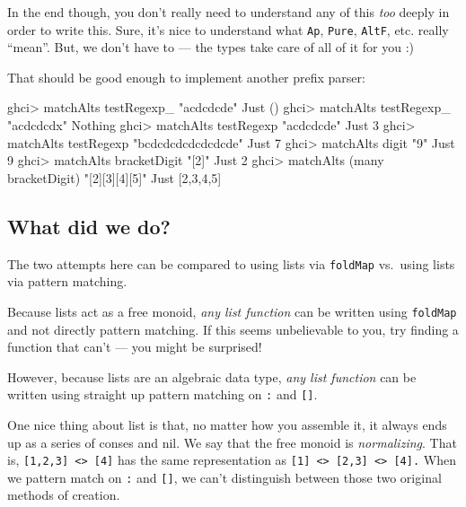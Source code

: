 \documentclass[]{article}
\newenvironment{Shaded}{}{}
\newcommand{\DataTypeTok}[1]{\textcolor[rgb]{0.56,0.13,0.00}{#1}}
\newcommand{\DecValTok}[1]{\textcolor[rgb]{0.25,0.63,0.44}{#1}}
\newcommand{\FunctionTok}[1]{\textcolor[rgb]{0.02,0.16,0.49}{#1}}
\newcommand{\NormalTok}[1]{#1}
\newcommand{\StringTok}[1]{\textcolor[rgb]{0.25,0.44,0.63}{#1}}
\begin{document}
In the end though, you don't really need to understand any of this \emph{too}
deeply in order to write this. Sure, it's nice to understand what \texttt{Ap},
\texttt{Pure}, \texttt{AltF}, etc. really ``mean''. But, we don't have to ---
the types take care of all of it for you :)

That should be good enough to implement another prefix parser:

\begin{Shaded}
\begin{Highlighting}[]
\NormalTok{ghci}\FunctionTok{>}\NormalTok{ matchAlts testRegexp_ }\StringTok{"acdcdcde"}
\DataTypeTok{Just}\NormalTok{ ()}
\NormalTok{ghci}\FunctionTok{>}\NormalTok{ matchAlts testRegexp_ }\StringTok{"acdcdcdx"}
\DataTypeTok{Nothing}
\NormalTok{ghci}\FunctionTok{>}\NormalTok{ matchAlts testRegexp }\StringTok{"acdcdcde"}
\DataTypeTok{Just} \DecValTok{3}
\NormalTok{ghci}\FunctionTok{>}\NormalTok{ matchAlts testRegexp }\StringTok{"bcdcdcdcdcdcdcde"}
\DataTypeTok{Just} \DecValTok{7}
\NormalTok{ghci}\FunctionTok{>}\NormalTok{ matchAlts digit }\StringTok{"9"}
\DataTypeTok{Just} \DecValTok{9}
\NormalTok{ghci}\FunctionTok{>}\NormalTok{ matchAlts bracketDigit }\StringTok{"[2]"}
\DataTypeTok{Just} \DecValTok{2}
\NormalTok{ghci}\FunctionTok{>}\NormalTok{ matchAlts (many bracketDigit) }\StringTok{"[2][3][4][5]"}
\DataTypeTok{Just}\NormalTok{ [}\DecValTok{2}\NormalTok{,}\DecValTok{3}\NormalTok{,}\DecValTok{4}\NormalTok{,}\DecValTok{5}\NormalTok{]}
\end{Highlighting}
\end{Shaded}

\hypertarget{what-did-we-do}{%
\subsection{What did we do?}\label{what-did-we-do}}

The two attempts here can be compared to using lists via \texttt{foldMap}
vs.~using lists via pattern matching.

Because lists act as a free monoid, \emph{any list function} can be written
using \texttt{foldMap} and not directly pattern matching. If this seems
unbelievable to you, try finding a function that can't --- you might be
surprised!

However, because lists are an algebraic data type, \emph{any list function} can
be written using straight up pattern matching on \texttt{:} and \texttt{{[}{]}}.

One nice thing about list is that, no matter how you assemble it, it always ends
up as a series of conses and nil. We say that the free monoid is
\emph{normalizing}. That is,
\texttt{{[}1,2,3{]}\ \textless{}\textgreater{}\ {[}4{]}} has the same
representation as
\texttt{{[}1{]}\ \textless{}\textgreater{}\ {[}2,3{]}\ \textless{}\textgreater{}\ {[}4{]}.}
When we pattern match on \texttt{:} and \texttt{{[}{]}}, we can't distinguish
between those two original methods of creation.
\end{document}

